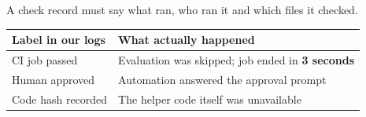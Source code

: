 \begin{frame}[t]{A check record must say what ran, who ran it and which files it checked.\ev{\tagM}}
{\fontsize{12}{15}\selectfont\begin{tabularx}{\linewidth}{@{}L{3.4cm}Y@{}}\toprule
\textbf{Label in our logs} & \textbf{What actually happened}\\\midrule
CI job passed & Evaluation was skipped; job ended in \textbf{3 seconds}\\[5pt]
Human approved & Automation answered the approval prompt\\[5pt]
Code hash recorded & The helper code itself was unavailable\\\bottomrule\end{tabularx}\par}
\vspace{.2cm}


\end{frame}
